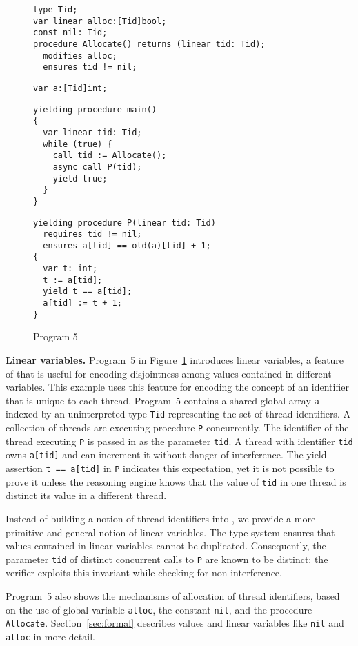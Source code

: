 \begin{figure}
\begin{verbatim}
type Tid;
var linear alloc:[Tid]bool;
const nil: Tid;
procedure Allocate() returns (linear tid: Tid);
  modifies alloc;
  ensures tid != nil;
\end{verbatim}
\begin{verbatim}
var a:[Tid]int;
\end{verbatim}
\begin{verbatim}
yielding procedure main()
{
  var linear tid: Tid;
  while (true) {
    call tid := Allocate();
    async call P(tid);
    yield true;
  }
}
\end{verbatim}
\begin{verbatim}
yielding procedure P(linear tid: Tid)
  requires tid != nil;
  ensures a[tid] == old(a)[tid] + 1;
{
  var t: int;
  t := a[tid];
  yield t == a[tid];
  a[tid] := t + 1;
}
\end{verbatim}
\caption{Program 5}
\label{fig:ex5}
\end{figure}

{\bf Linear variables.}
Program~5 in Figure~\ref{fig:ex5} introduces linear variables, a feature of \civl 
that is useful for encoding disjointness among values contained in 
different variables.  
This example uses this feature for encoding the concept of an identifier 
that is unique to each thread.
Program~5 contains a shared global array {\tt a} indexed by an uninterpreted type {\tt Tid} 
representing the set of thread identifiers.
A collection of threads are executing procedure {\tt P} concurrently.
The identifier of the thread executing {\tt P} is passed in as the parameter {\tt tid}.
A thread with identifier {\tt tid} owns {\tt a[tid]} and can increment it without danger of interference.
The yield assertion {\tt t == a[tid]} in {\tt P} indicates this expectation, yet it is not possible to prove it 
unless the reasoning engine knows that the value of {\tt tid} in one thread is distinct 
its value in a different thread.

Instead of building a notion of thread identifiers into \civl, we provide a more 
primitive and general notion of linear variables.
The \civl type system ensures that values contained in linear variables cannot be duplicated.
Consequently, the parameter {\tt tid} of distinct concurrent calls to {\tt P} are known to be distinct;
the \civl verifier exploits this invariant while checking for non-interference.

Program~5 also shows the mechanisms of allocation of thread identifiers,
based on the use of global variable {\tt alloc}, the constant {\tt nil}, and the procedure 
{\tt Allocate}.  
Section~\ref{sec:formal} describes values and linear variables like {\tt nil} and {\tt alloc} in more detail.

